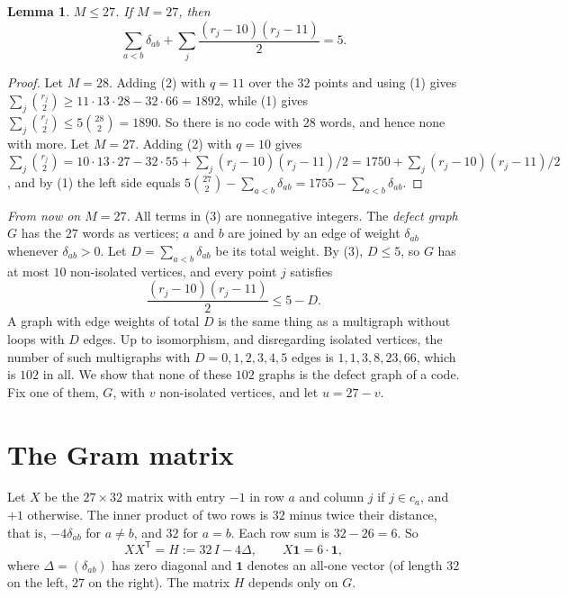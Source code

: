 \documentclass[11pt,a4paper]{article}
\newtheorem{lemma}{Lemma}
\newcommand{\one}{\mathbf{1}}
\newcommand{\T}{^{\mathsf T}}
\begin{document}
\begin{lemma}
$M\le 27$. If $M=27$, then
\begin{equation}
\sum_{a<b}\delta_{ab}+\sum_j\frac{(r_j-10)(r_j-11)}2=5. \tag{3}
\end{equation}
\end{lemma}

\begin{proof}
Let $M=28$. Adding (2) with $q=11$ over the $32$ points and using (1) gives
$\sum_j\binom{r_j}2\ge 11\cdot 13\cdot 28-32\cdot 66=1892$, while (1) gives
$\sum_j\binom{r_j}2\le 5\binom{28}2=1890$. So there is no code with $28$
words, and hence none with more.
Let $M=27$. Adding (2) with $q=10$ gives
$\sum_j\binom{r_j}2=10\cdot 13\cdot 27-32\cdot 55+\sum_j(r_j-10)(r_j-11)/2
=1750+\sum_j(r_j-10)(r_j-11)/2$, and by (1) the left side equals
$5\binom{27}2-\sum_{a<b}\delta_{ab}=1755-\sum_{a<b}\delta_{ab}$.
\end{proof}

\emph{From now on $M=27$.} All terms in (3) are nonnegative integers.
The \emph{defect graph} $G$ has the $27$ words as vertices; $a$ and $b$ are
joined by an edge of weight $\delta_{ab}$ whenever $\delta_{ab}>0$. Let
$D=\sum_{a<b}\delta_{ab}$ be its total weight. By (3), $D\le 5$, so $G$ has
at most $10$ non-isolated vertices, and every point $j$ satisfies
\begin{equation}
\frac{(r_j-10)(r_j-11)}2\le 5-D. \tag{4}
\end{equation}
A graph with edge weights of total $D$ is the same thing as a multigraph
without loops with $D$ edges. Up to isomorphism, and disregarding isolated
vertices, the number of such multigraphs with $D=0,1,2,3,4,5$ edges is
$1,1,3,8,23,66$, which is $102$ in all. We show that none of these $102$
graphs is the defect graph of a code. Fix one of them, $G$, with $v$
non-isolated vertices, and let $u=27-v$.

\section{The Gram matrix}

Let $X$ be the $27\times 32$ matrix with entry $-1$ in row $a$ and column
$j$ if $j\in c_a$, and $+1$ otherwise. The inner product of two rows is $32$
minus twice their distance, that is, $-4\delta_{ab}$ for $a\ne b$, and
$32$ for $a=b$. Each row sum is $32-26=6$. So
\begin{equation}
XX\T=H:=32\,I-4\Delta,\qquad X\one=6\cdot\one, \tag{5}
\end{equation}
where $\Delta=(\delta_{ab})$ has zero diagonal and $\one$ denotes an
all-one vector (of length $32$ on the left, $27$ on the right). The matrix
$H$ depends only on $G$.
\end{document}
